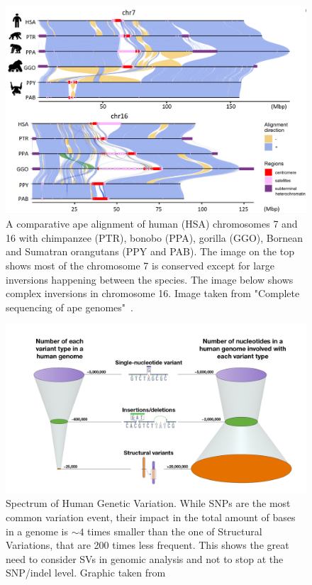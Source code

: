\begin{figure}[!ht]
	\centering
	\includegraphics[width=\linewidth]{figures/background/genome_diff.png}
	\caption[Genomic difference in chromosome 7 and 16 of 5 primate species.]{A comparative ape alignment of human (HSA) chromosomes 7 and 16 with chimpanzee (PTR), bonobo (PPA), gorilla (GGO), Bornean and Sumatran orangutans (PPY and PAB). The image on the top shows most of the chromosome 7 is conserved except for large inversions happening between the species. The image below shows complex inversions in chromosome 16. Image taken from "Complete sequencing of ape genomes"~\cite{ape_genomes}.}
	\label{fig:chromosome_diff}
\end{figure}

\begin{figure}[!ht]\clearpage
	\centering
	\includegraphics[width=.95\linewidth]{figures/background/genomic_spectrum.png}
	\caption[Spectrum of Human Genetic Variation.]{Spectrum of Human Genetic Variation. While SNPs are the most common variation event, their impact in the total amount of bases in a genome is $\sim4$ times smaller than the one of Structural Variations, that are 200 times less frequent. This shows the great need to consider SVs in genomic analysis and not to stop at the SNP/indel level. Graphic taken from~\cite{nih_variation}\\}
	\label{fig:variation_spectrum}
\end{figure}

